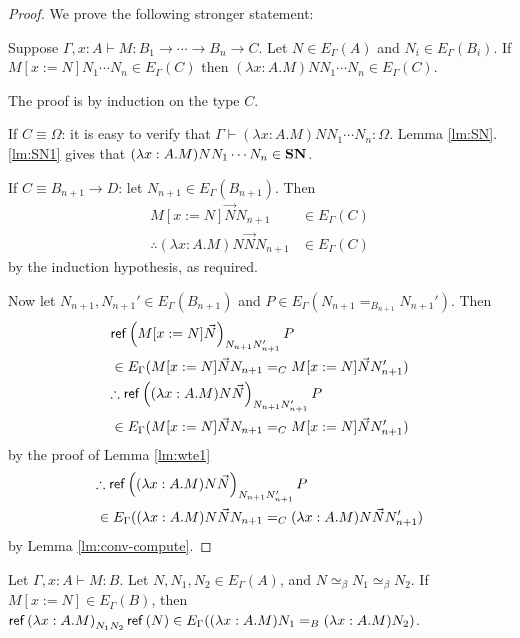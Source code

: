 \begin{proof}
We prove the following stronger statement:

Suppose $\Gamma, x : A \vdash M : B_1 \rightarrow \cdots \rightarrow B_n \rightarrow C$.  Let $N \in E_\Gamma(A)$ and $N_i \in E_\Gamma(B_i)$.  If
$M[x:=N]N_1 \cdots N_n \in E_\Gamma(C)$ then $(\lambda x:A.M)NN_1 \cdots N_n \in E_\Gamma(C)$.

The proof is by induction on the type $C$.

If $C \equiv \Omega$: it is easy to verify that $\Gamma \vdash (\lambda x:A.M)NN_1 \cdots N_n : \Omega$.  Lemma \ref{lm:SN}.\ref{lm:SN1}
gives that $(\lambda x:A.M)NN_1 \cdots N_n \in \mathbf{SN}$.

If $C \equiv B_{n+1} \rightarrow D$: let $N_{n+1} \in E_{\Gamma}(B_{n+1})$.  Then
\begin{align*}
M[x:=N]\vec{N} N_{n+1} & \in E_\Gamma(C) \\
\therefore (\lambda x:A.M)N \vec{N} N_{n+1} & \in E_\Gamma(C)
\end{align*}
by the induction hypothesis, as required.

Now let $N_{n+1}, N_{n+1}' \in E_\Gamma(B_{n+1})$ and $P \in E_\Gamma(N_{n+1} =_{B_{n+1}} N_{n+1}')$.  Then
\begin{align*}
\lefteqn{\reff{M[x:=N]\vec{N}}_{N_{n+1} N_{n+1}'} P} \\
\quad & \in E_\Gamma(M[x:=N] \vec{N} N_{n+1} =_C M[x:=N] \vec{N} N_{n+1}') \\
\lefteqn{\therefore \reff{(\lambda x:A.M)N \vec{N}}_{N_{n+1} N_{n+1}'} P} \\
 & \in E_\Gamma(M[x:=N] \vec{N} N_{n+1} =_C M[x:=N] \vec{N} N_{n+1}')
\end{align*}
by the proof of Lemma \ref{lm:wte1}
\begin{align*}
\lefteqn{\therefore \reff{(\lambda x:A.M)N \vec{N}}_{N_{n+1} N_{n+1}'} P} \\
\quad & \in E_\Gamma((\lambda x:A.M)N \vec{N} N_{n+1} =_C (\lambda x:A.M)N \vec{N} N_{n+1}')
\end{align*}
by Lemma \ref{lm:conv-compute}.
\end{proof}

\begin{lm}
\label{lm:wte3}
Let $\Gamma, x : A \vdash M : B$.  Let $N, N_1, N_2 \in E_\Gamma(A)$, and $N \simeq_\beta N_1 \simeq_\beta N_2$.  If $M[x:=N] \in E_\Gamma(B)$,
then $\mathsf{ref} \left( {\lambda x:A.M} \right)_{N_1 N_2} \mathsf{ref} \left( {N} \right) \in E_\Gamma((\lambda x:A.M)N_1 =_B (\lambda x:A.M) N_2)$.
\end{lm}

